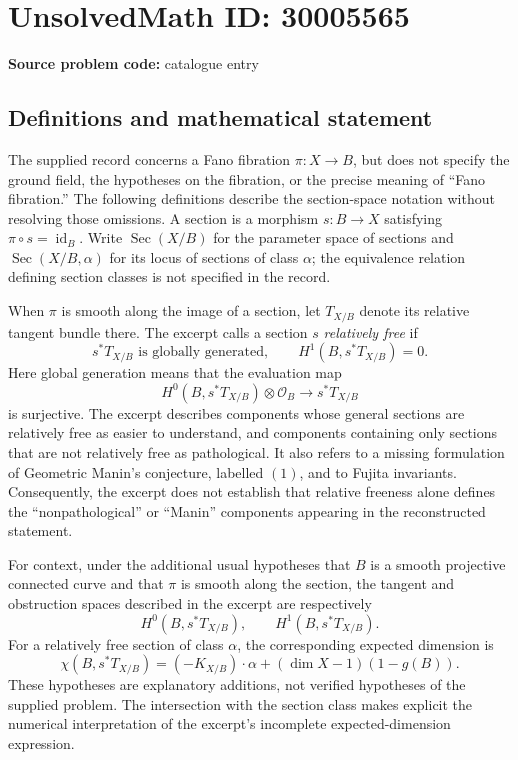 \documentclass[11pt]{article}
\begin{document}
\section*{UnsolvedMath ID: 30005565}
\textbf{Source problem code:} catalogue entry
\subsection{Definitions and mathematical statement}
The supplied record concerns a Fano fibration \(\pi:X\to B\), but does not specify the ground field, the hypotheses on the fibration, or the precise meaning of ``Fano fibration.'' The following definitions describe the section-space notation without resolving those omissions. A section is a morphism \(s:B\to X\) satisfying \(\pi\circ s=\operatorname{id}_B\). Write \(\operatorname{Sec}(X/B)\) for the parameter space of sections and \(\operatorname{Sec}(X/B,\alpha)\) for its locus of sections of class \(\alpha\); the equivalence relation defining section classes is not specified in the record.

When \(\pi\) is smooth along the image of a section, let \(T_{X/B}\) denote its relative tangent bundle there. The excerpt calls a section \(s\) \emph{relatively free} if
\[
s^*T_{X/B}\text{ is globally generated},\qquad H^1(B,s^*T_{X/B})=0.
\]
Here global generation means that the evaluation map
\[
H^0(B,s^*T_{X/B})\otimes\mathcal O_B\longrightarrow s^*T_{X/B}
\]
is surjective. The excerpt describes components whose general sections are relatively free as easier to understand, and components containing only sections that are not relatively free as pathological. It also refers to a missing formulation of Geometric Manin's conjecture, labelled \((1)\), and to Fujita invariants. Consequently, the excerpt does not establish that relative freeness alone defines the ``nonpathological'' or ``Manin'' components appearing in the reconstructed statement.

For context, under the additional usual hypotheses that \(B\) is a smooth projective connected curve and that \(\pi\) is smooth along the section, the tangent and obstruction spaces described in the excerpt are respectively
\[
H^0(B,s^*T_{X/B}),\qquad H^1(B,s^*T_{X/B}).
\]
For a relatively free section of class \(\alpha\), the corresponding expected dimension is
\[
\chi(B,s^*T_{X/B})=(-K_{X/B})\mathbin{\cdot}\alpha+(\dim X-1)(1-g(B)).
\]
These hypotheses are explanatory additions, not verified hypotheses of the supplied problem. The intersection with the section class makes explicit the numerical interpretation of the excerpt's incomplete expected-dimension expression.
\end{document}
